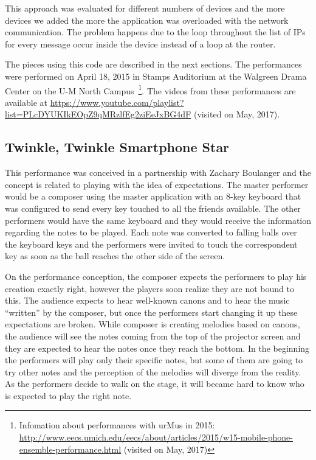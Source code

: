 This approach was evaluated for different numbers of devices and the more devices we added the more the application was overloaded with the network communication.
The problem happens due to the loop throughout the list of IPs for every message occur inside the device instead of a loop at the router.

The pieces using this code are described in the next sections.
The performances were performed on April 18, 2015 in Stamps Auditorium at the Walgreen Drama Center on the U-M North Campus~\footnote{Infomation about performances with urMus in 2015: \url{http://www.eecs.umich.edu/eecs/about/articles/2015/w15-mobile-phone-ensemble-performance.html} (visited on May, 2017)}.
The videos from these performances are available at \url{https://www.youtube.com/playlist?list=PLcDYUKIkEOpZ9qMRzlfEg2ziEeJxBG4dF} (visited on May, 2017).

\subsection*{Twinkle, Twinkle Smartphone Star}

This performance was conceived in a partnership with Zachary Boulanger and the concept is related to playing with the idea of expectations. 
The master performer would be a composer using the master application with an 8-key keyboard that was configured to send every key touched to all the friends available.
The other performers would have the same keyboard and they would receive the information regarding the notes to be played.
Each note was converted to falling balls over the keyboard keys and the performers were invited to touch the correspondent key as soon as the ball reaches the other side of the screen.

On the performance conception, the composer expects the performers to play his creation exactly right, however the players soon realize they are not bound to this.
The audience expects to hear well-known canons and to hear the music ``written'' by the composer, but once the performers start changing it up these expectations are broken.
While composer is creating melodies based on canons, the audience will see the notes coming from the top of the projector screen and they are expected to hear the notes once they reach the bottom. 
In the beginning the performers will play only their specific notes, but some of them are going to try other notes and the perception of the melodies will diverge from the reality. 
As the performers decide to walk on the stage, it will became hard to know who is expected to play the right note.


